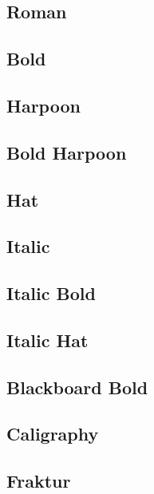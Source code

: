 \documentclass[11pt]{article}
\begin{document}
\subsection*{Roman}

\subsection*{Bold}

\subsection*{Harpoon}

\subsection*{Bold Harpoon}
\alphgrktb{}%

\subsection*{Hat}

\subsection*{Italic}
\alphgrktb{}

\subsection*{Italic Bold}

\subsection*{Italic Hat}

\subsection*{Blackboard Bold}

\subsection*{Caligraphy}

\subsection*{Fraktur}
\end{document}

